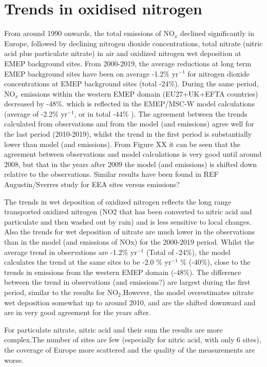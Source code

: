 \section{\label{sec:Trends_oxidised_nitrogen }Trends in oxidised nitrogen}



From around 1990 onwards, the total emissions of NO$_x$ declined significantly in Europe, followed by declining nitrogen dioxide concentrations, total nitrate (nitric acid plus particulate nitrate) in air and oxidized nitrogen wet deposition at EMEP background sites. From 2000-2019, the average reductions at long term EMEP background sites have been on average -1.2\% yr$^{-1}$ for nitrogen dioxide concentrations at EMEP background sites (total -24\%). During the same period, NO$_x$ emissions within the western EMEP domain (EU27+UK+EFTA countries) decreased by -48\%. which is reflected in the EMEP/MSC-W model calculations (average of -2.2\% yr$^{-1}$, or in total -44\% ). 
The agreement between the trends calculated from observations and from the model (and emissions) agree well for the last period (2010-2019), whilst the trend in the first period is substantially lower than model (and emissions). From Figure XX it can be seen that the agreement between observations and model calculations is very good until around 2008, but that in the years after 2009 the model (and emissions) is shifted down relative to the observations. Similar results have been found in REF Augustin/Sverres study for EEA sites versus emissions?


The trends in wet deposition of oxidized nitrogen reflects the long range transported oxidized nitrogen (NO2 that has been converted to nitric acid and particulate and then washed out by rain) and is less sensitive to local changes. Also the trends for wet deposition of nitrate are much lower in the observations than in the model (and emissions of NOx) for the 2000-2019 period. Whilst the average trend in observations are -1.2\% yr$^{-1}$ (Total of -24\%), the model calculates the trend at the same sites to be -2.0 \% yr$^{-1}$ \% (-40\%), close to the trends in emissions from the western EMEP domain (-48\%). The difference between the trend in observations (and emissions?) are largest during the first period, similar to the results for NO$_2$.However, the model overestimates nitrate wet deposition somewhat up to around 2010, and are the shifted downward and are in very good agreement for the years after. 

For particulate nitrate, nitric acid and their sum the results are more complex.The number of sites are few (especially for nitric acid, with only 6 sites), the coverage of Europe more scattered and the quality of the measurements are worse. 

